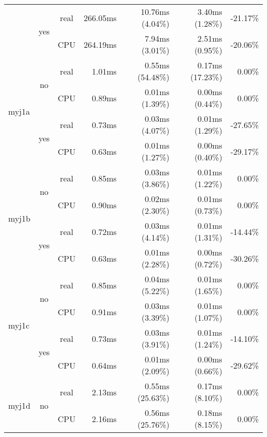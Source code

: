 \documentclass[en]{pracamgr}
\begin{document}
\begin{appendices}
\begin{small}
\begin{longtable}{|l|c|c|r|r|r|r|}
                          \cline{2-7}
                          & \multirow{2}{*}{yes} & real & 266.05ms & 10.76ms (4.04\%) & 3.40ms (1.28\%) & -21.17\% \\*
                          &                      & CPU  & 264.19ms & 7.94ms (3.01\%) & 2.51ms (0.95\%) & -20.06\% \\
\hline
\multirow{4}{*}{myj1a}    & \multirow{2}{*}{no}  & real & 1.01ms & 0.55ms (54.48\%) & 0.17ms (17.23\%) & 0.00\% \\*
                          &                      & CPU  & 0.89ms & 0.01ms (1.39\%) & 0.00ms (0.44\%) & 0.00\% \\*
                          \cline{2-7}
                          & \multirow{2}{*}{yes} & real & 0.73ms & 0.03ms (4.07\%) & 0.01ms (1.29\%) & -27.65\% \\*
                          &                      & CPU  & 0.63ms & 0.01ms (1.27\%) & 0.00ms (0.40\%) & -29.17\% \\
\hline
\multirow{4}{*}{myj1b}    & \multirow{2}{*}{no}  & real & 0.85ms & 0.03ms (3.86\%) & 0.01ms (1.22\%) & 0.00\% \\*
                          &                      & CPU  & 0.90ms & 0.02ms (2.30\%) & 0.01ms (0.73\%) & 0.00\% \\*
                          \cline{2-7}
                          & \multirow{2}{*}{yes} & real & 0.72ms & 0.03ms (4.14\%) & 0.01ms (1.31\%) & -14.44\% \\*
                          &                      & CPU  & 0.63ms & 0.01ms (2.28\%) & 0.00ms (0.72\%) & -30.26\% \\
\hline
\multirow{4}{*}{myj1c}    & \multirow{2}{*}{no}  & real & 0.85ms & 0.04ms (5.22\%) & 0.01ms (1.65\%) & 0.00\% \\*
                          &                      & CPU  & 0.91ms & 0.03ms (3.39\%) & 0.01ms (1.07\%) & 0.00\% \\*
                          \cline{2-7}
                          & \multirow{2}{*}{yes} & real & 0.73ms & 0.03ms (3.91\%) & 0.01ms (1.24\%) & -14.10\% \\*
                          &                      & CPU  & 0.64ms & 0.01ms (2.09\%) & 0.00ms (0.66\%) & -29.62\% \\
\hline
\multirow{4}{*}{myj1d}    & \multirow{2}{*}{no}  & real & 2.13ms & 0.55ms (25.63\%) & 0.17ms (8.10\%) & 0.00\% \\*
                          &                      & CPU  & 2.16ms & 0.56ms (25.76\%) & 0.18ms (8.15\%) & 0.00\% \\*

\end{longtable}
\end{small}
\end{appendices}
\end{document}
